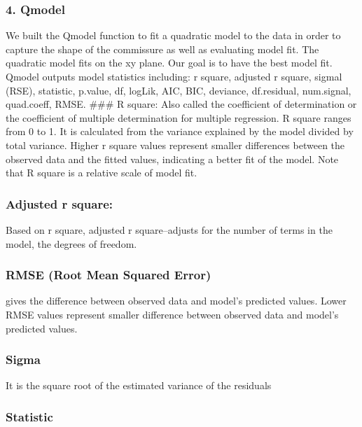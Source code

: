 \documentclass[10pt,letterpaper]{article}
\begin{document}
\hypertarget{qmodel}{%
\subsubsection{4. Qmodel}\label{qmodel}}

We built the Qmodel function to fit a quadratic model to the data in
order to capture the shape of the commissure as well as evaluating model
fit. The quadratic model fits on the xy plane. Our goal is to have the
best model fit. Qmodel outputs model statistics including: r square,
adjusted r square, sigmal (RSE), statistic, p.value, df, logLik, AIC,
BIC, deviance, df.residual, num.signal, quad.coeff, RMSE. \#\#\# R
square: Also called the coefficient of determination or the coefficient
of multiple determination for multiple regression. R square ranges from
0 to 1. It is calculated from the variance explained by the model
divided by total variance. Higher r square values represent smaller
differences between the observed data and the fitted values, indicating
a better fit of the model. Note that R square is a relative scale of
model fit.

\hypertarget{adjusted-r-square}{%
\subsubsection{Adjusted r square:}\label{adjusted-r-square}}

Based on r square, adjusted r square--adjusts for the number of terms in
the model, the degrees of freedom.

\hypertarget{rmse-root-mean-squared-error}{%
\subsubsection{RMSE (Root Mean Squared
Error)}\label{rmse-root-mean-squared-error}}

gives the difference between observed data and model's predicted values.
Lower RMSE values represent smaller difference between observed data and
model's predicted values.

\hypertarget{sigma}{%
\subsubsection{Sigma}\label{sigma}}

It is the square root of the estimated variance of the residuals

\hypertarget{statistic}{%
\subsubsection{Statistic}\label{statistic}}
\end{document}
